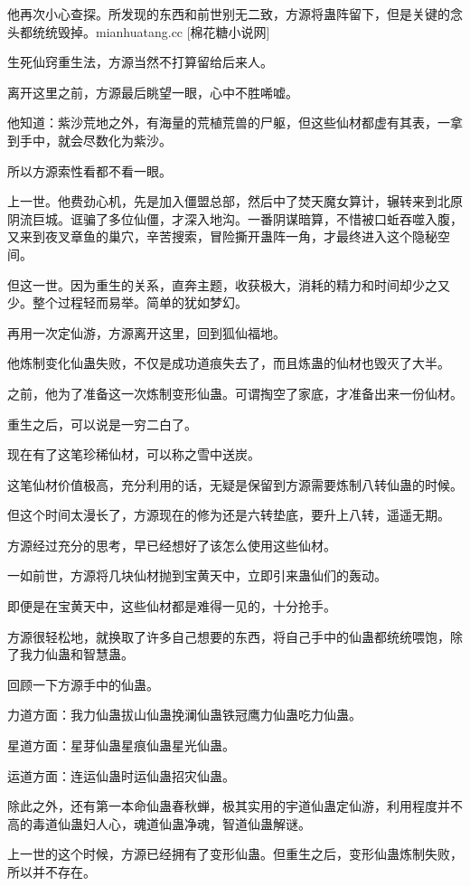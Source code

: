 \begin{this_body}
他再次小心查探。所发现的东西和前世别无二致，方源将蛊阵留下，但是关键的念头都统统毁掉。mianhuatang.cc [棉花糖小说网]

生死仙窍重生法，方源当然不打算留给后来人。

离开这里之前，方源最后眺望一眼，心中不胜唏嘘。

他知道：紫沙荒地之外，有海量的荒植荒兽的尸躯，但这些仙材都虚有其表，一拿到手中，就会尽数化为紫沙。

所以方源索性看都不看一眼。

上一世。他费劲心机，先是加入僵盟总部，然后中了焚天魔女算计，辗转来到北原阴流巨城。诓骗了多位仙僵，才深入地沟。一番阴谋暗算，不惜被口蚯吞噬入腹，又来到夜叉章鱼的巢穴，辛苦搜索，冒险撕开蛊阵一角，才最终进入这个隐秘空间。

但这一世。因为重生的关系，直奔主题，收获极大，消耗的精力和时间却少之又少。整个过程轻而易举。简单的犹如梦幻。

再用一次定仙游，方源离开这里，回到狐仙福地。

他炼制变化仙蛊失败，不仅是成功道痕失去了，而且炼蛊的仙材也毁灭了大半。

之前，他为了准备这一次炼制变形仙蛊。可谓掏空了家底，才准备出来一份仙材。

重生之后，可以说是一穷二白了。

现在有了这笔珍稀仙材，可以称之雪中送炭。

这笔仙材价值极高，充分利用的话，无疑是保留到方源需要炼制八转仙蛊的时候。

但这个时间太漫长了，方源现在的修为还是六转垫底，要升上八转，遥遥无期。

方源经过充分的思考，早已经想好了该怎么使用这些仙材。

一如前世，方源将几块仙材抛到宝黄天中，立即引来蛊仙们的轰动。

即便是在宝黄天中，这些仙材都是难得一见的，十分抢手。

方源很轻松地，就换取了许多自己想要的东西，将自己手中的仙蛊都统统喂饱，除了我力仙蛊和智慧蛊。

回顾一下方源手中的仙蛊。

力道方面：我力仙蛊拔山仙蛊挽澜仙蛊铁冠鹰力仙蛊吃力仙蛊。

星道方面：星芽仙蛊星痕仙蛊星光仙蛊。

运道方面：连运仙蛊时运仙蛊招灾仙蛊。

除此之外，还有第一本命仙蛊春秋蝉，极其实用的宇道仙蛊定仙游，利用程度并不高的毒道仙蛊妇人心，魂道仙蛊净魂，智道仙蛊解谜。

上一世的这个时候，方源已经拥有了变形仙蛊。但重生之后，变形仙蛊炼制失败，所以并不存在。


\end{this_body}
